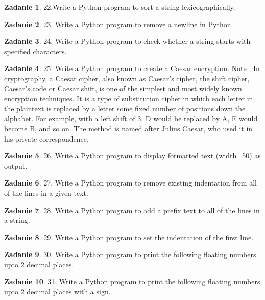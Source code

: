 \documentclass[11pt]{article}
\theoremstyle{definition}
\newtheorem{zadanie}{Zadanie}
\begin{document}
\begin{zadanie}
22.Write a Python program to sort a string lexicographically.
\end{zadanie}

\begin{zadanie}
23. Write a Python program to remove a newline in Python.
\end{zadanie}

\begin{zadanie}
24. Write a Python program to check whether a string starts with specified characters.
\end{zadanie}

\begin{zadanie}
25. Write a Python program to create a Caesar encryption.
Note : In cryptography, a Caesar cipher, also known as Caesar's cipher, the shift cipher, Caesar's code or Caesar shift, is one of the simplest and most widely known encryption techniques. It is a type of substitution cipher in which each letter in the plaintext is replaced by a letter some fixed number of positions down the alphabet. For example, with a left shift of 3, D would be replaced by A, E would become B, and so on. The method is named after Julius Caesar, who used it in his private correspondence.
\end{zadanie}

\begin{zadanie}
26. Write a Python program to display formatted text (width=50) as output.
\end{zadanie}

\begin{zadanie}
27. Write a Python program to remove existing indentation from all of the lines in a given text.
\end{zadanie}

\begin{zadanie}
28. Write a Python program to add a prefix text to all of the lines in a string.
\end{zadanie}

\begin{zadanie}
29. Write a Python program to set the indentation of the first line.
\end{zadanie}

\begin{zadanie}
30. Write a Python program to print the following floating numbers upto 2 decimal places.
\end{zadanie}

\begin{zadanie}
31. Write a Python program to print the following floating numbers upto 2 decimal places with a sign.
\end{zadanie}
\end{document}
